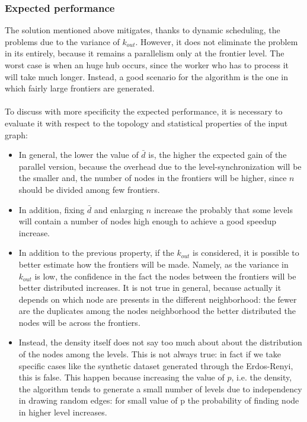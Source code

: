 \subsubsection{Expected performance}
\label{sec:how-it-perform}
The solution mentioned above mitigates, thanks to dynamic scheduling,
the problems due to the variance of $k_{out}$.
However, it does not eliminate the
problem in its entirely, because it remains 
a parallelism only at the frontier level.
The worst case is when an huge hub occurs, 
since the worker who has to process it
will take much longer. Instead, 
a good scenario for the algorithm is the one in which
fairly large frontiers are generated.
\\
\\
To discuss with more specificity the expected performance, it is necessary to evaluate it with respect to the topology and statistical properties of the input graph:
\begin{itemize}
    \item In general, the lower the value of $\bar{d}$ is, the higher the expected gain of the parallel version, because the overhead due to the level-synchronization will be the smaller and, the number of nodes in the frontiers will be higher, since $n$ should be divided among few frontiers.
    \item In addition, fixing $\bar{d}$ and enlarging $n$ increase the probably that some levels will contain a number of nodes high enough to achieve a good speedup increase.
    \item In addition to the previous property, if the $k_{out}$ is considered, it is possible to better estimate how the frontiers will be made. Namely, as the variance in $k_{out}$ is low, the confidence in the fact the nodes between the frontiers will be better distributed increases. It is not true in general, because actually it depends on which node are presents in the different neighborhood: the fewer are the duplicates among the nodes neighborhood the better distributed the nodes will be across the frontiers.
    \item Instead, the density itself does not say too much about about the distribution of the nodes among the levels. This is not always true: in fact if we take specific cases like the synthetic dataset generated through the Erdos-Renyi, this is false. This happen because increasing the value of $p$, i.e. the density, the algorithm tends to generate a small number of levels due to independency in drawing random edges: for small value of p the probability of finding node in higher level increases.

\end{itemize}

